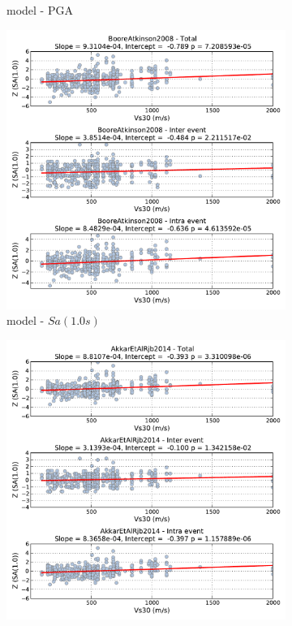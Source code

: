\begin{figure}[htb]
\begin{subfigure}[b]{0.49\textwidth}
      \caption{\textcite{Akkar_etal2014} model - PGA}
      \label{fig:pga_vs30_akkar2014}
  \end{subfigure}
    \begin{subfigure}[b]{0.49\textwidth}
      \includegraphics[width=\textwidth]{./figures/residuals/BA2008_Vs30_Sa1.pdf}
      \caption{\textcite{boore2008} model - $Sa \left( {1.0 s} \right)$}
      \label{fig:sa1_vs30_ba2008}
  \end{subfigure}
      \begin{subfigure}[b]{0.49\textwidth}
      \includegraphics[width=\textwidth]{./figures/residuals/Akkar2014_Vs30_Sa1.pdf}

\end{subfigure}
\end{figure}
